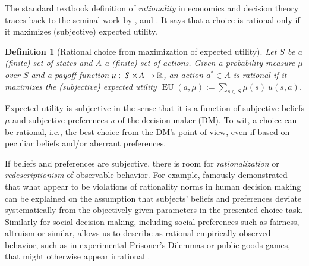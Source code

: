 \documentclass[fleqn,reqno,12pt]{article}
\theoremstyle{Satz}
\newtheorem{definition}[theorem]{Definition}
\theoremstyle{Bsp}
\newcommand{\mycolon}{\ensuremath{\thinspace \colon \thinspace}}
\newcommand{\EU}{\ensuremath{\operatorname{EU}}} %
\begin{document}
The standard textbook definition of \textit{rationality} in economics and decision theory
traces back to the seminal work by \citet{deFinetti37}, \citet{Neumannvon-NeumannMorgenstern1944:Theory-of-Games}
and \citet{Savage1954:The-Foundations}. It says that a choice is rational only if it maximizes
(subjective) expected utility.

\begin{definition}[Rational choice from maximization of expected utility]
  \label{def:rationality}
  Let $S$ be a (finite) set of states and $A$ a (finite) set of actions. Given a
  probability measure $\mu$ over $S$ and a payoff function
  $u \mycolon S \times A \rightarrow \mathbb{R} $, an action $a^* \in A$ is rational
  if it maximizes the \emph{(subjective) expected utility}
  $\EU(a, \mu) := \sum_{s \in S} \mu(s) \ u(s, a)$.
\end{definition}

\noindent Expected utility is subjective in the sense that it is a function of subjective
beliefs $\mu$ and subjective preferences $u$ of the decision maker (DM). To wit, a choice can be
rational, i.e., the best choice from the DM's point of view, even if based on peculiar beliefs
and/or aberrant preferences. %

If beliefs and preferences are subjective, there is room for \emph{rationalization} or
\emph{redescriptionism} of observable behavior. For example,
\citet{KahnemannTversky1979:Prospect-Theory} famously demonstrated that what appear to be
violations of rationality norms in human decision making can be explained on the assumption
that subjects' beliefs and preferences deviate systematically from the objectively given
parameters in the presented choice task. Similarly for social decision making, including social
preferences such as fairness, altruism or similar, allows us to describe as rational
empirically observed behavior, such as in experimental Prisoner's Dilemmas or public goods
games, that might otherwise appear irrational \citep[e.g.,][]{fehrschmidt99,charrab02}.
\end{document}
